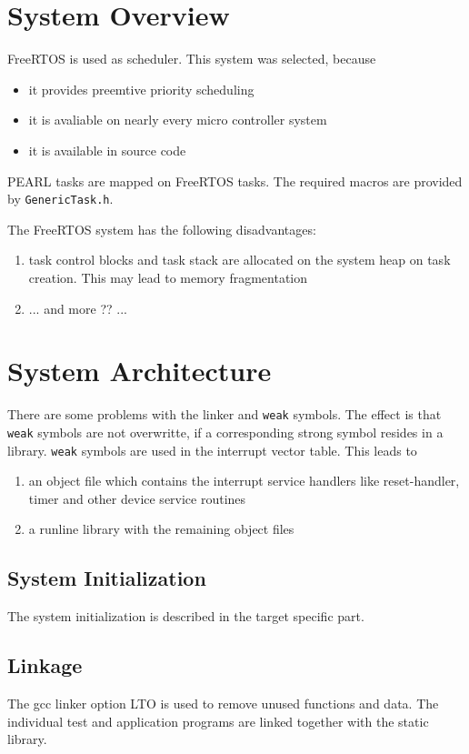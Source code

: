 \section{System Overview}
FreeRTOS is used as scheduler. This system was selected, because
\begin{itemize}
\item it provides preemtive priority scheduling
\item it is avaliable on nearly every micro controller system
\item it is available in source code
\end{itemize}

PEARL tasks are mapped on FreeRTOS tasks. The required macros
are provided by \texttt{GenericTask.h}.

The FreeRTOS system has the following disadvantages:
\begin{enumerate}
\item task control blocks and task stack are allocated on the system
   heap on task creation. This may lead to memory fragmentation
\item ... and more ?? ... 
\end{enumerate}


\section{System Architecture}
There are some problems with the linker and \texttt{weak} symbols.
The effect is that \texttt{weak} symbols are not overwritte, if
a corresponding strong symbol resides in a library.
\texttt{weak} symbols are used in the interrupt vector table. This
leads to
\begin{enumerate}
\item an object file which contains the interrupt service handlers like
   reset-handler, timer and other device service routines
\item a runline library with the remaining object files
\end{enumerate}

\subsection{System Initialization}
The system initialization is described in the target specific part.

\subsection{Linkage}
The gcc linker option LTO is used to remove unused functions and data. 
The individual test and application programs are linked together with 
the static library.

